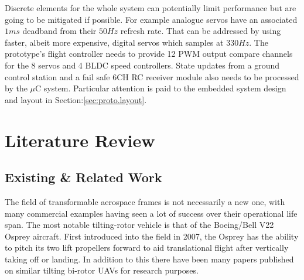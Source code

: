 Discrete elements for the whole system can potentially limit performance but are going to be mitigated if possible. For example analogue servos have an associated $1 ms$ deadband from their $50 Hz$ refresh rate. That can be addressed by using faster, albeit more expensive, digital servos which samples at $330 Hz$. The prototype's flight controller needs to provide 12 PWM output compare channels for the 8 servos and 4 BLDC speed controllers. State updates from a ground control station and a fail safe 6CH RC receiver module also needs to be processed by the $\mu$C system. Particular attention is paid to the embedded system design and layout in Section:\ref{sec:proto.layout}.%
\section{Literature Review}
\label{sec:intro.litreview}
\subsection{Existing \& Related Work}
\label{subsec:intro.lit.related}
The field of transformable aerospace frames is not necessarily a new one, with many commercial examples having seen a lot of success over their operational life span. The most notable tilting-rotor vehicle is that of the Boeing/Bell V22 Osprey\cite{.} aircraft. First introduced into the field in 2007, the Osprey has the ability to pitch its two lift propellers forward to aid translational flight after vertically taking off or landing. In addition to this there have been many papers published on similar tilting bi-rotor UAVs for research purposes.
